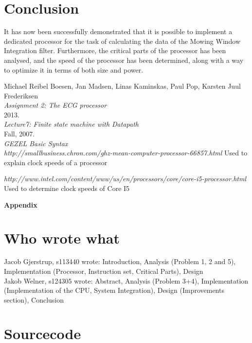 \documentclass[12pt,a4paper]{article}
\begin{document}
\section{Conclusion}
It has now been successfully demonstrated that it is possible to implement a dedicated processor for the task of calculating the data of the Mowing Window Integration filter. Furthermore, the critical parts of the processor has been analysed, and the speed of the processor has been determined, along with a way to optimize it in terms of both size and power.
\newpage
\begin{thebibliography}{9}

  Michael Reibel Boesen, Jan Madsen, Linas Kaminskas, Paul Pop, Karsten Juul Frederiksen\\
  \emph{Assignment 2: The ECG processor}\\
  2013.\\

  \emph{Lecture7: Finite state machine with Datapath}\\
  Fall, 2007.\\

  \emph{GEZEL Basic Syntax}\\
  
  \emph{http://smallbusiness.chron.com/ghz-mean-computer-processor-66857.html}
  Used to explain clock speeds of a processor
  
  \emph{http://www.intel.com/content/www/us/en/processors/core/core-i5-processor.html}
  Used to determine clock speeds of Core I5
\end{thebibliography}
	
\newpage	
	\begin{Large}
		\textbf{Appendix}
	\end{Large}
	\appendix

\section{Who wrote what}
Jacob Gjerstrup, s113440 wrote: Introduction, Analysis (Problem 1, 2 and 5), Implementation (Processor, Instruction set, Critical Parts), Design\\
Jakob Welner, s124305 wrote: Abstract, Analysis (Problem 3+4), Implementation (Implementation of the CPU, System Integration), Design (Improvements section), Conclusion\\

\section{Sourcecode}
\end{document}
